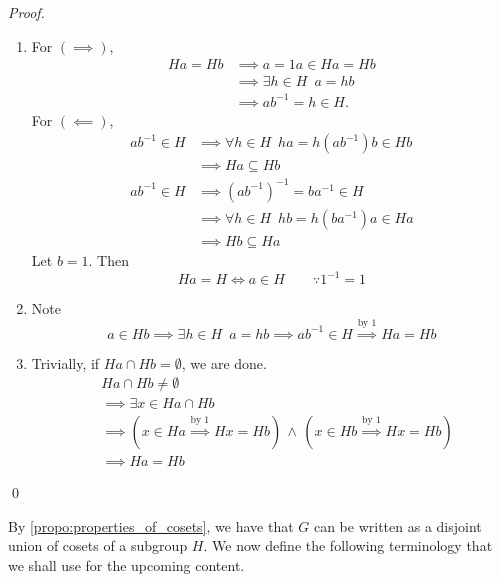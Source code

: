 \documentclass[notoc,notitlepage]{tufte-book}
\begin{document}
\begin{proof}
  \begin{enumerate}
    \item For $(\implies)$,
      \begin{align*}
        Ha = Hb &\implies a = 1a \in Ha = Hb \\
                &\implies \exists h \in H \enspace a = hb \\
                &\implies ab^{-1} = h \in H.
      \end{align*}
      For $(\impliedby)$,
      \begin{align*}
        ab^{-1} \in H &\implies \forall h \in H \enspace ha = h(ab^{-1})b \in Hb \\
            &\implies Ha \subseteq Hb \\
        ab^{-1} \in H &\implies (ab^{-1})^{-1} = ba^{-1} \in H \\
            &\implies \forall h \in H \enspace hb = h(ba^{-1})a \in Ha \\
            &\implies Hb \subseteq Ha
      \end{align*}
      Let $b = 1$. Then
      \begin{equation*}
        Ha = H \iff a \in H \qquad \because 1^{-1} = 1
      \end{equation*}

    \item Note
      \begin{equation*}
        a \in Hb \implies \exists h \in H \enspace a = hb \implies ab^{-1} \in H \overset{\text{by 1}}{\implies} Ha = Hb
      \end{equation*}

    \item Trivially, if $Ha \cap Hb = \emptyset$, we are done.
      \begin{align*}
        &Ha \cap Hb \neq \emptyset \\ 
        &\implies \exists x \in Ha \cap Hb \\
        &\implies ( x \in Ha \overset{\text{by 1}}{\implies} Hx = Hb ) \, \land \, ( x \in Hb \overset{\text{by 1}}{\implies} Hx = Hb ) \\
        &\implies Ha = Hb
      \end{align*}
  \end{enumerate}\qed
\end{proof}

By \cref{propo:properties_of_cosets}, we have that $G$ can be written as a disjoint union of cosets of a subgroup $H$. We now define the following terminology that we shall use for the upcoming content.
\end{document}
